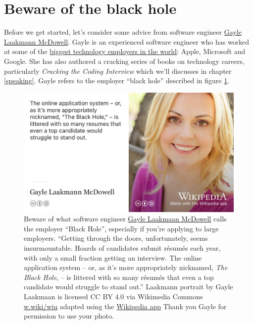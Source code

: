 \documentclass[
]{book}
\begin{document}
\hypertarget{blackhole}{%
\section{Beware of the black hole}\label{blackhole}}

Before we get started, let's consider some advice from software engineer \href{https://en.wikipedia.org/wiki/Gayle_Laakmann_McDowell}{Gayle Laakmann McDowell}. Gayle is an experienced software engineer who has worked at some of the \href{https://en.wikipedia.org/wiki/Big_Tech}{biggest technology employers in the world}: Apple, Microsoft and Google. She has also authored a cracking series of books on technology careers, particularly \emph{Cracking the Coding Interview} \citep{cracking} which we'll discusses in chapter \ref{speaking}. Gayle refers to the employer ``black hole'' described in figure \ref{fig:gayle-fig}.

\begin{figure}

{\centering \includegraphics[width=0.99\linewidth]{images/gayle-black-hole} 

}

\caption{Beware of what software engineer \href{https://en.wikipedia.org/wiki/Gayle_Laakmann_McDowell}{Gayle Laakmaan McDowell} calls the employer ``Black Hole'', especially if you're applying to large employers. ``Getting through the doors, unfortunately, seems insurmountable. Hoards of candidates submit résumés each year, with only a small fraction getting an interview. The online application system -- or, as it's more appropriately nicknamed, \emph{The Black Hole}, -- is littered with so many résumés that even a top candidate would struggle to stand out.'' \citep{blackhole, techcareer} Laakmann portrait by Gayle Laakmaan is licensed CC BY 4.0 via Wikimedia Commons \href{https://w.wiki/wiu}{w.wiki/wiu} adapted using the \href{https://apps.apple.com/us/app/wikipedia/id324715238}{Wikipedia app} Thank you Gayle for permission to use your photo.}\label{fig:gayle-fig}
\end{figure}
\end{document}
